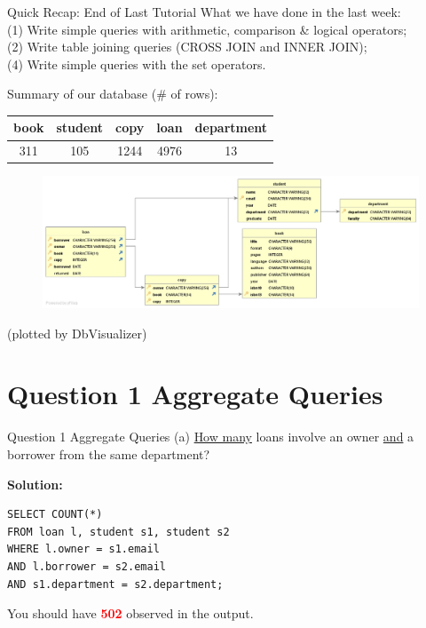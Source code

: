 \begin{frame}[fragile]{Quick Recap: End of Last Tutorial}
	What we have done in the last week:\\\vspace{5pt}
	(1) Write simple queries with arithmetic, comparison \& logical operators;\\
	(2) Write table joining queries (CROSS JOIN and INNER JOIN);\\
	(4) Write simple queries with the set operators.\\\vspace{5pt}
	
	Summary of our database (\# of rows):\\\vspace{5pt}
	\centering
	\begin{tabular}{|c|c|c|c|c|} \hline
		\textbf{book} & \textbf{student} & \textbf{copy} & \textbf{loan} & \textbf{department}\\ \hline
		311 & 105 & 1244 & 4976 & 13 \\ \hline
	\end{tabular}
	
	\begin{figure}
		\includegraphics[width=1\textwidth]{t1/images/t1-end.png}
	\end{figure}\vspace{-10pt}
	{\tiny(plotted by DbVisualizer)}
\end{frame}

\section*{Question 1 Aggregate Queries}

\begin{frame}[fragile]{Question 1 Aggregate Queries (a)}
\underline{How many} loans involve an owner \underline{and} a borrower from the same department?\\ \vspace{10pt}

\textbf{Solution:}\\
\begin{lstlisting}
SELECT COUNT(*)
FROM loan l, student s1, student s2
WHERE l.owner = s1.email 
AND l.borrower = s2.email
AND s1.department = s2.department;
\end{lstlisting}
\vspace{10pt}
You should have \textcolor{red}{\textbf{502}} observed in the output. 
\end{frame}


